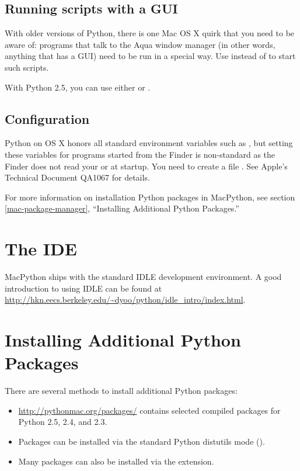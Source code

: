 \subsection{Running scripts with a GUI \label{osx-gui-scripts}}

With older versions of Python, there is one Mac OS X quirk that you need to be
aware of: programs that talk to the Aqua window manager (in other words,
anything that has a GUI) need to be run in a special way. Use 
instead of  to start such scripts.

With Python 2.5, you can use either  or .

\subsection{Configuration}

Python on OS X honors all standard \UNIX{} environment variables such as
, but setting these variables for programs started from the
Finder is non-standard as the Finder does not read your  or
 at startup. You need to create a file . See Apple's Technical Document QA1067 for
details.

For more information on installation Python packages in MacPython, see section
\ref{mac-package-manager}, ``Installing Additional Python Packages.''


\section{The IDE\label{IDE}}

MacPython ships with the standard IDLE development environment. A good
introduction to using IDLE can be found at
\url{http://hkn.eecs.berkeley.edu/~dyoo/python/idle_intro/index.html}.


\section{Installing Additional Python Packages \label{mac-package-manager}}

There are several methods to install additional Python packages:

\begin{itemize}
\item \url{http://pythonmac.org/packages/} contains selected compiled packages
  for Python 2.5, 2.4, and 2.3.
\item Packages can be installed via the standard Python distutils mode
  ().
\item Many packages can also be installed via the 
  extension.
\end{itemize}


